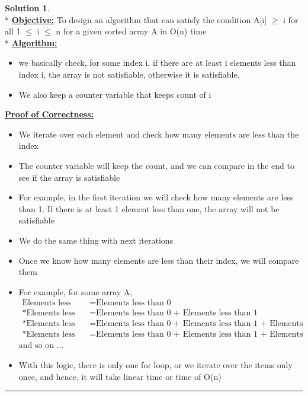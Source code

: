 \documentclass{article}
\theoremstyle{definition}
\def\fline{\rule{0.75\linewidth}{0.5pt}}
\newcommand{\finishline}{\vspace{-15pt}\begin{center}\fline\end{center}}
\newtheorem*{solution*}{Solution}
\newenvironment{solution}{\begin{solution*}}{{\finishline} \end{solution*}}
\begin{document}
\begin{solution}
	\hfill \bigskip\\*
	\textbf{\underline{Objective:}} To design an algorithm that can satisfy the condition A[i] $\geq$ i for all 1 $\leq$ i  $\leq$ n for a given sorted array A in O(n) time \bigskip\\*
	\textbf{\underline{Algorithm:}}
	\begin{itemize}
		\item we basically check, for some index i, if there are at least i elements less than index i, the array is not satisfiable, otherwise it is satisfiable.
		\item We also keep a counter variable that keeps count of i
	\end{itemize} 
	\textbf{\underline{Proof of Correctness:}}
		\begin{itemize}
			\item We iterate over each element and check how many elements are less than the index
			\item The counter variable will keep the count, and we can compare in the end to see if the array is satisfiable
			\item For example, in the first iteration we will check how many elements are less than 1. If there is at least 1 element less than one, the array will not be satisfiable
			\item We do the same thing with next iterations
			\item Once we know how many elements are less than their index, we will compare them
			\item For example, for some array A,
			\begin{align*}
				{\text{Elements less than 1}} &= {\text{Elements less than 0 }}\\*
				{\text{Elements less than 2}} &= {\text{Elements less than 0 + Elements less than 1}}\\*
				{\text{Elements less than 3}} &= {\text{Elements less than 0 + Elements less than 1 + Elements less than 2}}\\*
				{\text{Elements less than 4}} &= {\text{Elements less than 0 + Elements less than 1 + Elements less than 2 + Elements less than 3}}
			\end{align*}
			and so on $\dots$
			\item With this logic, there is only one for loop, or we iterate over the items only once, and hence, it will take linear time or time of O(n)
	\end{itemize} 
\end{solution}
\end{document}
